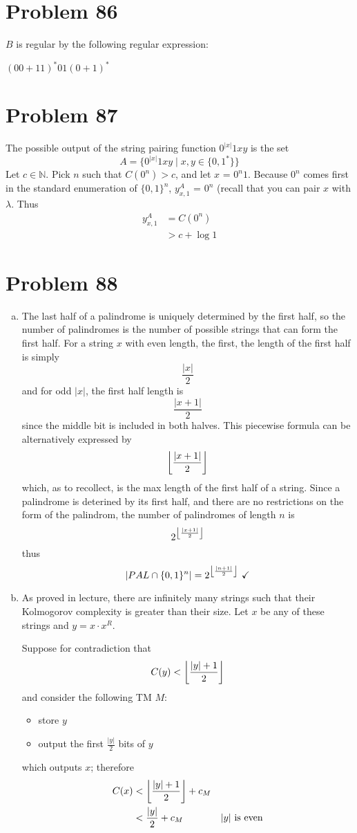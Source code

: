 \documentclass[11pt]{article}
\DeclarePairedDelimiter\floor{\lfloor}{\rfloor}
\begin{document}
\section*{Problem 86} $B$ is regular by the following regular expression: 

$(00 + 11)^* 01 (0+1)^* $


\section*{Problem 87}

The possible output of the string pairing function $0^{|x|}1xy$ is the set
	\[A = \{0^{|x|}1xy \mid x,y \in \{0,1^*\}\}\]
Let $c \in \mathbb{N}$.
Pick $n$ such that $C(0^n) > c$, and let $x$ = $0^n1$.
Because $0^n$ comes first in the standard enumeration of $\{0,1\}^n$, $y_{x,1} ^A$ = $0^n$ (recall that you can pair $x$ with $\lambda$.
Thus
	\begin{align*}
		y_{x,1} ^A &= C(0^n) \\
		&> c + \log 1
	\end{align*}


\section*{Problem 88}
\begin{enumerate}[(a)]
	\item The last half of a palindrome is uniquely determined by the first half, so the number of palindromes is the number of possible strings that can form the first half. 
	For a string $x$ with even length, the first, the length of the first half is simply 
		\[\frac{|x|}{2} \] 
	and for odd $|x|$, the first half length is
		\[\frac{|x+1|}{2} \]
	since the middle bit is included in both halves.
	This piecewise formula can be alternatively expressed by
		\[\floor*{ \frac{|x+1|}{2} } \]
	which, as to recollect, is the max length of the first half of a string.
	Since a palindrome is deterined by its first half, and there are no restrictions on the form of the palindrom, the number of palindromes of length $n$ is 
		\[2^{\floor*{ \frac{|x+1|}{2} }} \]
	thus
		\[ |PAL \cap \{0,1\}^n| = 2^{\floor*{ \frac{|n+1|}{2} }}\ \checkmark\]

	\item  As proved in lecture, there are infinitely many strings such that their Kolmogorov complexity is greater than their size.
	Let $x$ be any of these strings and $y = x \cdot x^R$.

	Suppose for contradiction that 
		\[C(y) < \floor*{ \frac{|y|+1}{2}} \]
	and consider the following TM $M$:
		\begin{itemize}
			\item store $y$
			\item output the first $\frac{|y|}{2}$ bits of $y$
		\end{itemize}
	which outputs $x$; therefore
		\begin{align*}
			C(x) &< \floor*{ \frac{|y|+1}{2}} + c_M \\
			&< \frac{|y|}{2} + c_M &|y| \text{ is even}
		\end{align*}


\end{enumerate}
\end{document}
